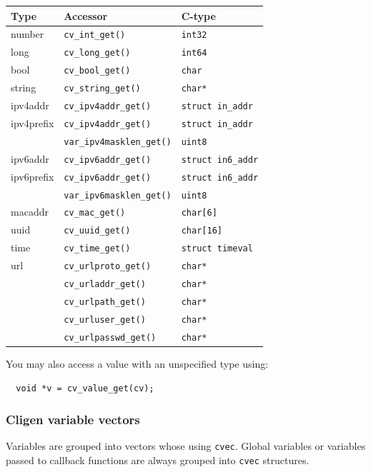 \documentclass[a4paper, 10pt] {article}
\begin{document}
\begin{tabular}{ | l | l | l | }
\hline
  \textbf{ Type} & \textbf{Accessor} & \textbf{C-type}\\
\hline
number & {\tt cv\_int\_get()} & {\tt int32} \\
long & {\tt cv\_long\_get()} & {\tt int64} \\
bool & {\tt cv\_bool\_get()} & {\tt char} \\
string & {\tt cv\_string\_get()} & {\tt char*} \\
ipv4addr   & {\tt cv\_ipv4addr\_get()} & {\tt struct in\_addr}\\
ipv4prefix & {\tt cv\_ipv4addr\_get()} & {\tt struct in\_addr}\\
           & {\tt var\_ipv4masklen\_get()} & {\tt uint8}\\
ipv6addr   & {\tt cv\_ipv6addr\_get()} & {\tt struct in6\_addr}\\
ipv6prefix & {\tt cv\_ipv6addr\_get()} & {\tt struct in6\_addr}\\
           & {\tt var\_ipv6masklen\_get()} & {\tt uint8}\\
macaddr    & {\tt cv\_mac\_get()} & {\tt char[6]}\\
uuid       & {\tt cv\_uuid\_get()} & {\tt char[16]}\\
time       & {\tt cv\_time\_get()} & {\tt struct timeval}\\
url        & {\tt cv\_urlproto\_get()} & {\tt char*}\\
           & {\tt cv\_urladdr\_get()} & {\tt char*}\\
           & {\tt cv\_urlpath\_get()} & {\tt char*}\\
           & {\tt cv\_urluser\_get()} & {\tt char*}\\
           & {\tt cv\_urlpasswd\_get()} & {\tt char*}\\
\hline
\end{tabular}

You may also access a value with an unspecified type using:
\begin{verbatim}
  void *v = cv_value_get(cv);
\end{verbatim}


\subsubsection{Cligen variable vectors}
Variables are grouped into vectors whose using {\tt cvec}. Global variables or variables
passed to callback functions are always grouped into {\tt cvec}
structures.
\end{document}
